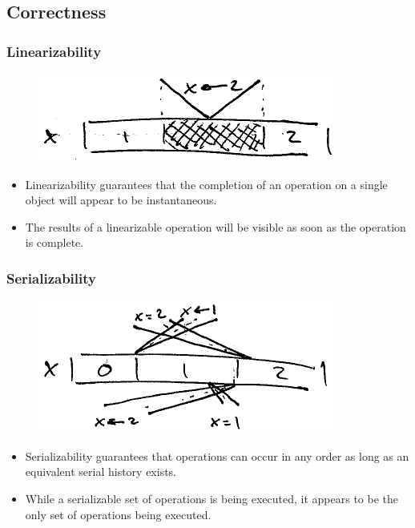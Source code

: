 \documentclass{beamer}
\begin{document}
  \subsection{Correctness}

  \begin{frame}
    \frametitle{Linearizability}

    \begin{figure}
      \centering
      \includegraphics{linearizability}
    \end{figure}

    \begin{itemize}
      \item Linearizability guarantees that the completion of an operation on a single object will appear to be instantaneous.
      \item The results of a linearizable operation will be visible as soon as the operation is complete.
    \end{itemize}
  \end{frame}

  \begin{frame}
    \frametitle{Serializability}

    \begin{figure}
      \centering
      \includegraphics{serializability}
    \end{figure}

    \begin{itemize}
      \item Serializability guarantees that operations can occur in any order as long as an equivalent serial history exists.
      \item While a serializable set of operations is being executed, it appears to be the only set of operations being executed.
    \end{itemize}
  \end{frame}
\end{document}
